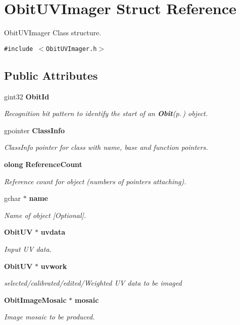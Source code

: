 \section{Obit\-UVImager Struct Reference}
\label{structObitUVImager}
Obit\-UVImager Class structure.  


{\tt \#include $<$Obit\-UVImager.h$>$}

\subsection*{Public Attributes}
\begin{CompactItemize}
\item 
gint32 {\bf Obit\-Id}
\begin{CompactList}\small\item\em Recognition bit pattern to identify the start of an {\bf Obit}{\rm (p.\,\pageref{structObit})} object. \item\end{CompactList}\item 
gpointer {\bf Class\-Info}
\begin{CompactList}\small\item\em Class\-Info pointer for class with name, base and function pointers. \item\end{CompactList}\item 
{\bf olong} {\bf Reference\-Count}
\begin{CompactList}\small\item\em Reference count for object (numbers of pointers attaching). \item\end{CompactList}\item 
gchar $\ast$ {\bf name}
\begin{CompactList}\small\item\em Name of object [Optional]. \item\end{CompactList}\item 
{\bf Obit\-UV} $\ast$ {\bf uvdata}
\begin{CompactList}\small\item\em Input UV data. \item\end{CompactList}\item 
{\bf Obit\-UV} $\ast$ {\bf uvwork}
\begin{CompactList}\small\item\em selected/calibrated/edited/Weighted UV data to be imaged \item\end{CompactList}\item 
{\bf Obit\-Image\-Mosaic} $\ast$ {\bf mosaic}
\begin{CompactList}\small\item\em Image mosaic to be produced. \item\end{CompactList}\end{CompactItemize}


